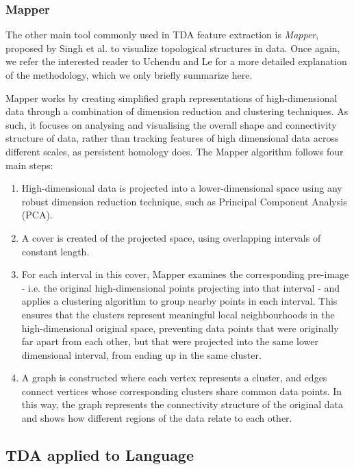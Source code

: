 \documentclass[12pt,twoside]{report}
\begin{document}
\subsubsection{Mapper}

The other main tool commonly used in TDA feature extraction is \textit{Mapper}, proposed by Singh et al. \cite{singh2007} to visualize topological structures in data. Once again, we refer the interested reader to Uchendu and Le \cite{uchendu2024unveilingtopologicalstructurestext} for a more detailed explanation of the methodology, which we only briefly summarize here. \newline \par

Mapper works by creating simplified graph representations of high-dimensional data through a combination of dimension reduction and clustering techniques. As such, it focuses on analysing and visualising the overall shape and connectivity structure of data, rather than tracking features of high dimensional data across different scales, as persistent homology does. The Mapper algorithm follows four main steps: 
\begin{enumerate}[itemsep=0pt]
    \item High-dimensional data is projected into a lower-dimensional space using any robust dimension reduction technique, such as Principal Component Analysis (PCA).
    \item A cover is created of the projected space, using overlapping intervals of constant length.
    \item For each interval in this cover, Mapper examines the corresponding pre-image - i.e. the original high-dimensional points projecting into that interval - and applies a clustering algorithm to group nearby points in each interval. This ensures that the clusters represent meaningful local neighbourhoods in the high-dimensional original space, preventing data points that were originally far apart from each other, but that were projected into the same lower dimensional interval, from ending up in the same cluster.
    \item A graph is constructed where each vertex represents a cluster, and edges connect vertices whose corresponding clusters share common data points. In this way, the graph represents the connectivity structure of the original data and shows how different regions of the data relate to each other. 
\end{enumerate}   

\subsection{TDA applied to Language}
\end{document}
